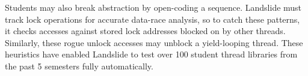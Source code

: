 Students may also break abstraction by open-coding a  sequence.
Landslide must track lock operations for accurate data-race analysis,
so to catch these patterns, it
checks accesses against stored lock addresses blocked on by other threads.
Similarly, these rogue unlock accesses may unblock a yield-looping thread.
These heuristics have enabled Landslide to test over 100 student thread libraries from the past 5 semesters fully automatically.
